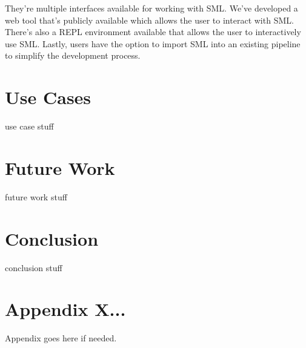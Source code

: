 \documentclass[jair,twoside,11pt,theapa]{article}
\begin{document}
They're multiple interfaces available for working with SML. We've developed a web tool that's publicly available which allows the user to interact with SML. There's also a REPL environment available that allows the user to interactively use SML. Lastly, users have the option to import SML into an existing pipeline to simplify the development process.

\section{Use Cases}
\label{use-cases}
use case stuff


\section{Future Work}
\label{future-work}
future work stuff

\section{Conclusion}
\label{conclusion}
conclusion stuff


\appendix
\section*{Appendix X...}

Appendix goes here if needed.

\vskip 0.2in


\end{document}
